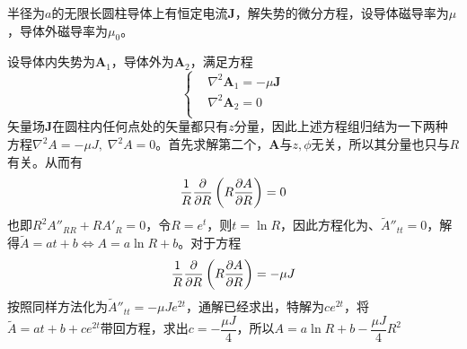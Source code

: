 \documentclass{mynote}
\begin{document}
\begin{exercise}{3.7}
    半径为$a$的无限长圆柱导体上有恒定电流$\bm{J}$，解失势的微分方程，设导体磁导率为$\mu$，导体外磁导率为$\mu_0$。
\end{exercise}
\begin{solution}
设导体内失势为$\bm{A}_1$，导体外为$\bm{A}_2$，满足方程
\[
\left\{
    \begin{aligned}
        & \nabla^2 \bm{A}_1 = -\mu \bm{J} \\
        & \nabla^2 \bm{A}_2 = 0 \\
    \end{aligned} 
\right.    
\]    
矢量场$\bm{J}$在圆柱内任何点处的矢量都只有$z$分量，因此上述方程组归结为一下两种方程$\nabla^2 A = -\mu J,\; \nabla^2 A = 0$。首先求解第二个，$\bm{A}$与$z,\phi$无关，所以其分量也只与$R$有关。从而有
\[
\frac{1}{R} \dfrac{\partial }{\partial R} \left( R \dfrac{\partial A}{\partial R} \right) = 0   
\]
也即$R^2 A '' _{RR} + R A '_{R} = 0$，令$R = e^t$，则$t = \ln R$，因此方程化为$、\tilde{A}''_{tt} = 0$，解得$\tilde{A} = at + b \Leftrightarrow A= a\ln R + b$。对于方程
\[
    \frac{1}{R} \dfrac{\partial }{\partial R} \left( R \dfrac{\partial A}{\partial R} \right) = -\mu J
\]
按照同样方法化为$\tilde{A}''_{tt} = -\mu J e^{2t}$，通解已经求出，特解为$ce^{2t}$，将$\tilde{A} = at + b + ce^{2t}$带回方程，求出$c=-\dfrac{\mu J}{4}$，所以$A = a\ln R + b -\dfrac{\mu J}{4} R^2$

\end{solution}
\end{document}
